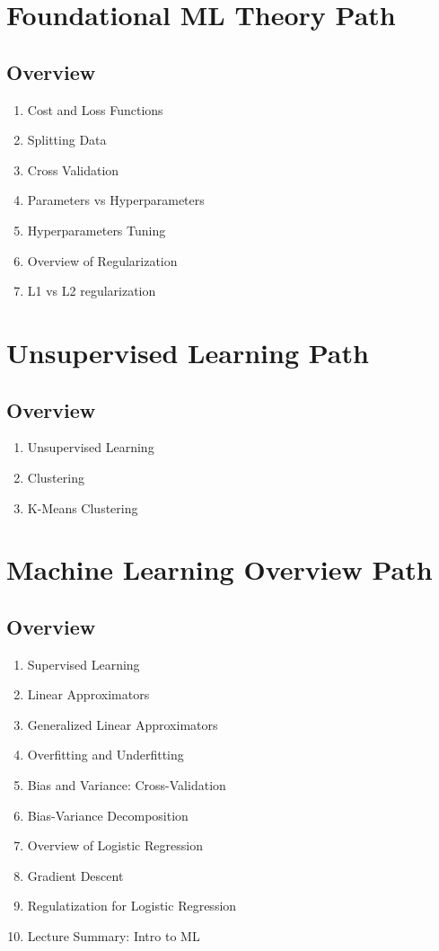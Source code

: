 \documentclass{article}
\begin{document}
\section{Foundational ML Theory Path}
\subsection{Overview}%
\label{sub:Overview}

\begin{enumerate}
    \item Cost and Loss Functions
    \item Splitting Data
    \item Cross Validation
    \item Parameters vs Hyperparameters
    \item Hyperparameters Tuning
    \item Overview of Regularization
    \item L1 vs L2 regularization
\end{enumerate}

\section{Unsupervised Learning Path}
\subsection{Overview}%
\label{sub:Overview}

\begin{enumerate}
    \item Unsupervised Learning
    \item Clustering
    \item K-Means Clustering
\end{enumerate}

\section{Machine Learning Overview Path}
\subsection{Overview}%
\label{sub:Overview}

\begin{enumerate}
    \item Supervised Learning
    \item Linear Approximators
    \item Generalized Linear Approximators
    \item Overfitting and Underfitting
    \item Bias and Variance: Cross-Validation
    \item Bias-Variance Decomposition
    \item Overview of Logistic Regression
    \item Gradient Descent
    \item Regulatization for Logistic Regression
    \item Lecture Summary: Intro to ML
\end{enumerate}
\end{document}
